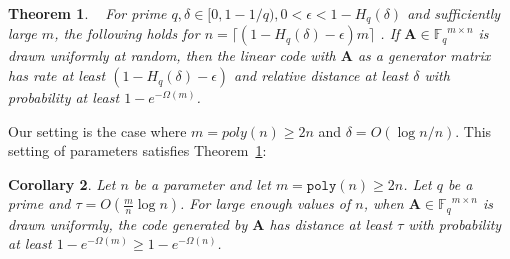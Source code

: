 \documentclass[11pt]{article}
\newcommand{\thref}[1]{\mbox{Theorem~\ref{#1}}}
\newcommand{\vect}[1]{\ensuremath{\textbf{#1}}}
\newcommand{\Fq}{\ensuremath{\mathbb{F}_q}}
\newcommand{\poly}{\ensuremath{\mathtt{poly}}\xspace}
\newtheorem{theorem}{Theorem}[section]
\newtheorem{corollary}[theorem]{Corollary}
\newcommand{\vA}{\vect{A}}
\begin{document}
\begin{theorem}~\cite[Theorem 8]{venkatLecture}
\label{thm:random code good distance}
For prime $q, \delta\in [0, 1-1/q), 0<\epsilon< 1-H_q(\delta)$ and sufficiently large $m$, the following holds for $n = \lceil (1-H_q(\delta) - \epsilon)m\rceil$ .  If $\vA \in \Fq^{m\times n}$ is drawn uniformly at random, then the linear code with $\vA$ as a generator matrix has rate at least $(1-H_q(\delta) -\epsilon)$ and relative distance at least $\delta$ with probability at least $1-e^{-\Omega(m)}$.
\end{theorem}
Our setting is the case where $m = poly(n)\geq 2n$ and $\delta = O (\log n /n)$.  This setting of parameters satisfies \thref{thm:random code good distance}:
\begin{corollary}
\label{cor:code high distance}
Let $n$ be a parameter and let $m = \poly(n)\geq 2n$.  
Let $q$ be a prime and $\tau = O(\frac{m}{n}\log n )$.  For large enough values of $n$, when $\vA\in \Fq^{m\times n}$ is drawn uniformly, the code generated by $\vA$ has distance at least $\tau$ with probability at least $1-e^{-\Omega(m)}\geq 1-e^{-\Omega(n)}$.
\end{corollary}
\end{document}
